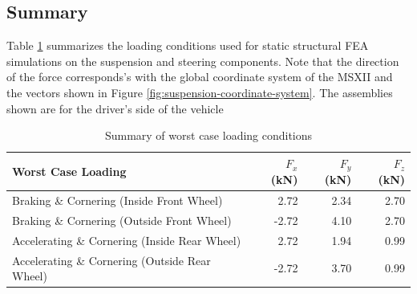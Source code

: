 \documentclass[10pt]{article}
\begin{document}
\subsection{Summary}
Table \ref{tab:worst-case-loading} summarizes the loading conditions used for static structural FEA simulations on the suspension and steering components. Note that the direction of the force corresponds's with the global coordinate system of the MSXII and the vectors shown in Figure \ref{fig:suspension-coordinate-system}. The assemblies shown are for the driver's side of the vehicle

\begin{table}[h!]
\centering
\caption{Summary of worst case loading conditions}
\label{tab:worst-case-loading}
\begin{tabular}{lrrr}
\toprule
Worst Case Loading                             & $F_x$ (\si{\kilo\newton}) & $F_y$ (\si{\kilo\newton}) & $F_z$ (\si{\kilo\newton}) \\
\midrule
Braking \& Cornering (Inside Front Wheel)      & 2.72                     & 2.34                     & 2.70                     \\
Braking \& Cornering (Outside Front Wheel)     & -2.72                    & 4.10                     & 2.70                     \\
Accelerating \& Cornering (Inside Rear Wheel)  & 2.72                     & 1.94                     & 0.99                     \\
Accelerating \& Cornering (Outside Rear Wheel) & -2.72                    & 3.70                     & 0.99                     \\
\bottomrule
\end{tabular}
\end{table}
\end{document}
